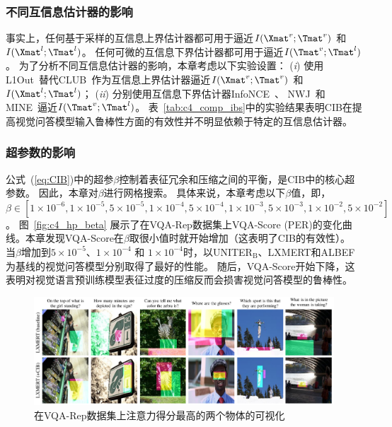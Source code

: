 



\subsubsection{不同互信息估计器的影响}
事实上，任何基于采样的互信息上界估计器都可用于逼近$I(\Xmat^v; \Tmat^v)$ 和 $I(\Xmat^l; \Tmat^l)$。
任何可微的互信息下界估计器都可用于逼近$I(\Tmat^v; \Tmat^l)$。
为了分析不同互信息估计器的影响，本章考虑以下实验设置：
(\emph{i}) 使用L1Out~\cite{poole2019variational}替代CLUB~\cite{cheng2020club}作为互信息上界估计器逼近$I(\Xmat^v; \Tmat^v)$ 和 $I(\Xmat^l; \Tmat^l)$；
(\emph{ii}) 分别使用互信息下界估计器InfoNCE~\cite{oord2018representation}、 NWJ~\cite{nguyen2010estimating}和 MINE~\cite{belghazi2018mine}逼近$I(\Tmat^v; \Tmat^l)$。
表~\ref{tab:c4_comp_ibs}中的实验结果表明CIB在提高视觉问答模型输入鲁棒性方面的有效性并不明显依赖于特定的互信息估计器。



\subsubsection{超参数的影响}
公式~(\ref{eq:CIB})中的超参$\beta$控制着表征冗余和压缩之间的平衡，是CIB中的核心超参数。
因此，本章对$\beta$进行网格搜索。
具体来说，本章考虑以下$\beta$值，即，$\beta \in [1\times10^{-6}, 1\times10^{-5}, 5\times10^{-5}, 1\times10^{-4}, 5\times10^{-4}, 1\times10^{-3}, 5\times10^{-3}, 1\times10^{-2}, 5\times10^{-2}]$。
图~\ref{fig:c4_hp_beta} 展示了在VQA-Rep数据集上VQA-Score (PER)的变化曲线。本章发现VQA-Score在$\beta$取很小值时就开始增加（这表明了CIB的有效性）。
当$\beta$增加到$5\times10^{-5}$、$1\times10^{-4}$ 和 $1\times10^{-4}$时，以UNITER$_\text{B}$、LXMERT和ALBEF为基线的视觉问答模型分别取得了最好的性能。
随后，VQA-Score开始下降，这表明对视觉语言预训练模型表征过度的压缩反而会损害视觉问答模型的鲁棒性。






\begin{figure}[!t]
\centering
\includegraphics[width=1.0\linewidth]{figure/c4_hm.pdf}
\caption{在VQA-Rep数据集上注意力得分最高的两个物体的可视化}
\label{fig:c4_example_hm}
\end{figure}

